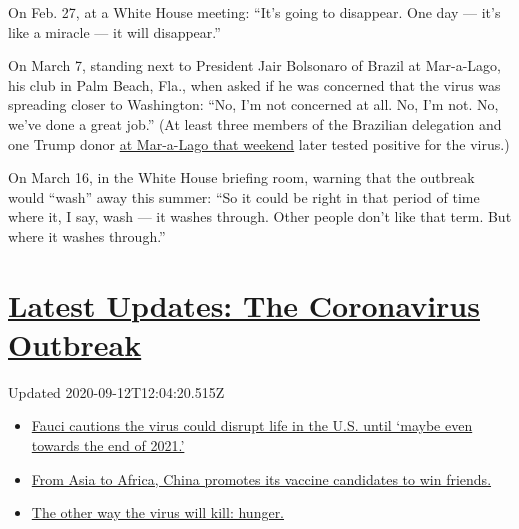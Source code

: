 On Feb. 27, at a White House meeting: ``It's going to disappear. One day
--- it's like a miracle --- it will disappear.''

On March 7, standing next to President Jair Bolsonaro of Brazil at
Mar-a-Lago, his club in Palm Beach, Fla., when asked if he was concerned
that the virus was spreading closer to Washington: ``No, I'm not
concerned at all. No, I'm not. No, we've done a great job.'' (At least
three members of the Brazilian delegation and one Trump donor
\href{https://www.nytimes3xbfgragh.onion/2020/03/14/us/politics/trump-coronavirus-mar-a-lago.html}{at
Mar-a-Lago that weekend} later tested positive for the virus.)

On March 16, in the White House briefing room, warning that the outbreak
would ``wash'' away this summer: ``So it could be right in that period
of time where it, I say, wash --- it washes through. Other people don't
like that term. But where it washes through.''

\hypertarget{latest-updates-the-coronavirus-outbreak}{%
\section{\texorpdfstring{\href{https://www.nytimes3xbfgragh.onion/2020/09/11/world/covid-19-coronavirus.html?action=click\&pgtype=Article\&state=default\&region=MAIN_CONTENT_1\&context=storylines_live_updates}{Latest
Updates: The Coronavirus
Outbreak}}{Latest Updates: The Coronavirus Outbreak}}\label{latest-updates-the-coronavirus-outbreak}}

Updated 2020-09-12T12:04:20.515Z

\begin{itemize}
\tightlist
\item
  \href{https://www.nytimes3xbfgragh.onion/2020/09/11/world/covid-19-coronavirus.html?action=click\&pgtype=Article\&state=default\&region=MAIN_CONTENT_1\&context=storylines_live_updates\#link-dfb8a16}{Fauci
  cautions the virus could disrupt life in the U.S. until `maybe even
  towards the end of 2021.'}
\item
  \href{https://www.nytimes3xbfgragh.onion/2020/09/11/world/covid-19-coronavirus.html?action=click\&pgtype=Article\&state=default\&region=MAIN_CONTENT_1\&context=storylines_live_updates\#link-7104d154}{From
  Asia to Africa, China promotes its vaccine candidates to win friends.}
\item
  \href{https://www.nytimes3xbfgragh.onion/2020/09/11/world/covid-19-coronavirus.html?action=click\&pgtype=Article\&state=default\&region=MAIN_CONTENT_1\&context=storylines_live_updates\#link-393ad215}{The
  other way the virus will kill: hunger.}
\end{itemize}

